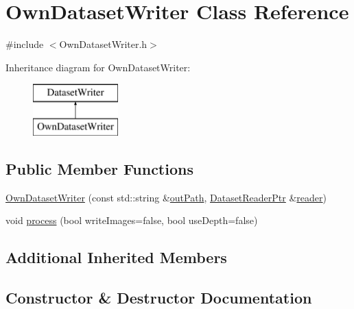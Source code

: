 \hypertarget{class_own_dataset_writer}{}\section{Own\+Dataset\+Writer Class Reference}
\label{class_own_dataset_writer}


{\ttfamily \#include $<$Own\+Dataset\+Writer.\+h$>$}

Inheritance diagram for Own\+Dataset\+Writer\+:\begin{figure}[H]
\begin{center}
\leavevmode
\includegraphics[height=2.000000cm]{class_own_dataset_writer}
\end{center}
\end{figure}
\subsection*{Public Member Functions}
\begin{DoxyCompactItemize}
\item 
\hyperlink{class_own_dataset_writer_a3adfa565a630b270f0cf36560e80f111}{Own\+Dataset\+Writer} (const std\+::string \&\hyperlink{class_dataset_writer_ac19eabc3e69f6e9bc4c5185803eed626}{out\+Path}, \hyperlink{_dataset_reader_8h_a30d89cba514a220d64d04535c0465f1c}{Dataset\+Reader\+Ptr} \&\hyperlink{class_dataset_writer_a2edef70c0de507a2e056eb3984705811}{reader})
\item 
void \hyperlink{class_own_dataset_writer_a63b35dd2752ea15af5ab5b25693d135c}{process} (bool write\+Images=false, bool use\+Depth=false)
\end{DoxyCompactItemize}
\subsection*{Additional Inherited Members}


\subsection{Constructor \& Destructor Documentation}
\mbox{\label{class_own_dataset_writer_a3adfa565a630b270f0cf36560e80f111}} 
